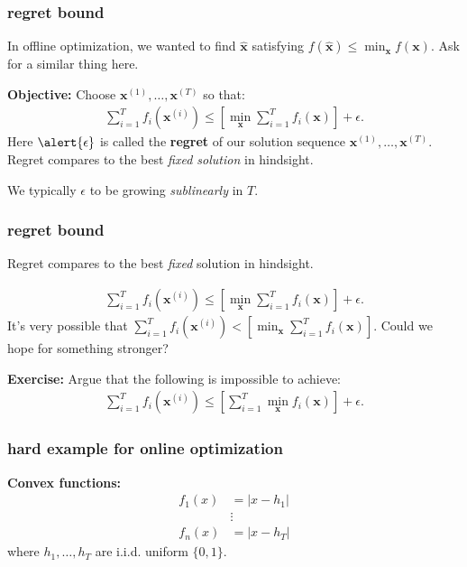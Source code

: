 \documentclass[compress]{beamer}
\newcommand{\bv}[1]{\mathbf{#1}}
\begin{document}
\begin{frame}[t]
	\frametitle{regret bound}
	In offline optimization, we wanted to find $\hat{\bv{x}}$ satisfying $f(\hat{\bv{x}}) \leq \min_{\bv{x}} f(\bv{x})$. Ask for a similar thing here. 
	
	\textbf{Objective:} Choose $\bv{x}^{(1)}, \ldots, \bv{x}^{(T)}$ so that: 
	\begin{align*}
		\sum_{i=1}^T f_i(\bv{x}^{(i)}) \leq \left[\min_\bv{x} \sum_{i=1}^T f_i(\bv{x})\right] + \epsilon.
	\end{align*}
	Here $\alert{\epsilon}$ is called the \alert{\textbf{regret}} of our solution sequence $\bv{x}^{(1)}, \ldots, \bv{x}^{(T)}$. 		Regret compares to the best \emph{fixed solution} in hindsight.

	
	We typically $\epsilon$ to be growing \emph{sublinearly} in $T$. 
\end{frame}

\begin{frame}[t]
	\frametitle{regret bound}
	\begin{center}
		Regret compares to the best \emph{fixed} solution in hindsight.
	\end{center}
	\begin{align*}
		\sum_{i=1}^T f_i(\bv{x}^{(i)}) \leq \left[\min_\bv{x} \sum_{i=1}^T f_i(\bv{x})\right] + \epsilon.
	\end{align*}
	It's very possible that $\sum_{i=1}^T f_i(\bv{x}^{(i)}) < \left[\min_\bv{x} \sum_{i=1}^T f_i(\bv{x})\right]$. Could we hope for something stronger?
	
	\textbf{Exercise:} Argue that the following is impossible to achieve:
	\begin{align*}
		\sum_{i=1}^T f_i(\bv{x}^{(i)}) \leq \left[\sum_{i=1}^T \min_\bv{x} f_i(\bv{x})\right] + \epsilon.
	\end{align*}
\end{frame}

\begin{frame}[t]
	\frametitle{hard example for online optimization}
	\textbf{Convex functions:}
	\begin{align*}
		f_1(x) &= |x - h_1|\\
		 &\vdots\\
		 f_n(x) &= |x - h_T|
	\end{align*}
where $h_1, \ldots, h_T$ are i.i.d. uniform $\{0,1\}$.
\end{frame}
\end{document}
